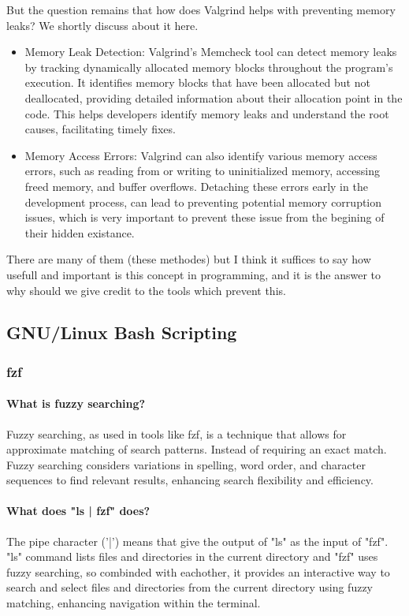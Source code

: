 \documentclass[12pt]{article}
\begin{document}
	But the question remains that how does Valgrind helps with preventing memory leaks? We shortly discuss about it here.

	\begin{itemize}

		\item Memory Leak Detection:
		Valgrind's Memcheck tool can detect memory leaks by tracking dynamically allocated memory blocks throughout the program's execution.
		It identifies memory blocks that have been allocated but not deallocated, providing detailed information about their allocation point in the code.
		This helps developers identify memory leaks and understand the root causes, facilitating timely fixes.

		\item Memory Access Errors:
		Valgrind can also identify various memory access errors, such as reading from or writing to uninitialized memory, accessing freed memory, and buffer overflows. Detaching these errors early in the development process, can lead to preventing potential memory corruption issues, which is very important to prevent these issue from the begining of their hidden existance.

	\end{itemize}

	There are many of them (these methodes) but I think it suffices to say how usefull and important is this concept in programming, and it is the answer to why should we give credit to the tools which prevent this.


	\subsection{GNU/Linux Bash Scripting}
	\subsubsection{fzf}
	\paragraph{What is fuzzy searching?}
	Fuzzy searching, as used in tools like fzf, is a technique that allows for approximate matching of search patterns. Instead of requiring an exact match.
	Fuzzy searching considers variations in spelling, word order, and character sequences to find relevant results, enhancing search flexibility and efficiency.

	\paragraph{What does "ls | fzf" does?}
	The pipe character ('|') means that give the output of "ls" as the input of "fzf".
	"ls" command lists files and directories in the current directory
	and "fzf" uses fuzzy searching, so combinded with eachother,
	it provides an interactive way to search and select files and directories from the current directory using fuzzy matching, enhancing navigation within the terminal.
\end{document}
